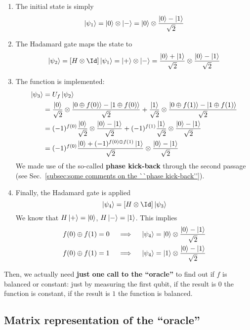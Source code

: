 \begin{enumerate}
    \item The initial state is simply
    \[
        \ket{\psi_1} = \ket{0} \otimes \ket{-} = \ket{0} \otimes \frac{\ket{0} - \ket{1}}{\sqrt{2}}
    \]
    \item The Hadamard gate maps the state to
    \[
        \ket{\psi_2} = \lrS{H \otimes \Id} \ket{\psi_1} = \ket{+} \otimes \ket{-} = \frac{\ket{0} + \ket{1}}{\sqrt{2}} \otimes \frac{\ket{0} - \ket{1}}{\sqrt{2}}
    \]
    \item The function is implemented:
    \[
    \begin{aligned}
        \ket{\psi_3} &= U_f \ket{\psi_2} \\
        &= \frac{\ket{0}}{\sqrt{2}} \otimes \frac{\ket{0 \oplus f(0)} - \ket{1 \oplus f(0)}}{\sqrt{2}} + \frac{\ket{1}}{\sqrt{2}} \otimes \frac{\ket{0 \oplus f(1)} - \ket{1 \oplus f(1)}}{\sqrt{2}} \\
        &= (-1)^{f(0)} \frac{\ket{0}}{\sqrt{2}} \otimes \frac{\ket{0} - \ket{1}}{\sqrt{2}} + (-1)^{f(1)} \frac{\ket{1}}{\sqrt{2}} \otimes \frac{\ket{0} - \ket{1}}{\sqrt{2}} \\
        &= (-1)^{f(0)} \frac{\ket{0} + (-1)^{f(0) \oplus f(1)} \ket{1}}{\sqrt{2}} \otimes \frac{\ket{0} - \ket{1}}{\sqrt{2}}
    \end{aligned}
    \]
    We made use of the so-called \textbf{phase kick-back} through the second passage (see Sec.~\ref{subsec:some comments on the ``phase kick-back''}).
    \item Finally, the Hadamard gate is applied
    \[
        \ket{\psi_4} = \lrS{H \otimes \Id} \ket{\psi_3}
    \]
    We know that $H \ket{+} = \ket{0}$, $H \ket{-} = \ket{1}$. This implies
    \[
    \begin{aligned}
        f(0) \oplus f(1) = 0 \quad&\implies\quad \ket{\psi_4} = \ket{0} \otimes \frac{\ket{0} - \ket{1}}{\sqrt{2}} \\
        f(0) \oplus f(1) = 1 \quad&\implies\quad \ket{\psi_4} = \ket{1} \otimes \frac{\ket{0} - \ket{1}}{\sqrt{2}}
    \end{aligned}
    \]
\end{enumerate}
Then, we actually need \textbf{just one call to the ``oracle''} to find out if $f$ is balanced or constant: just by measuring the first qubit, if the result is $0$ the function is constant, if the result is $1$ the function is balanced.

\subsection{Matrix representation of the ``oracle''}

